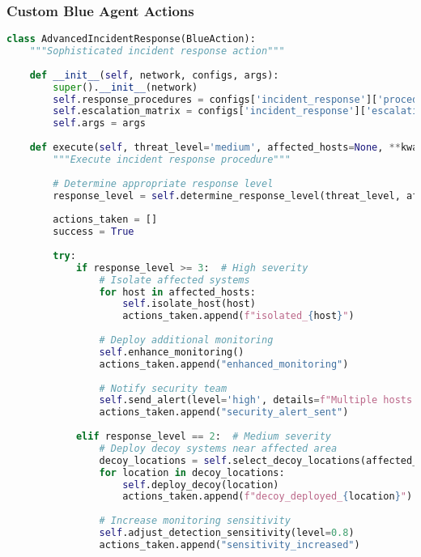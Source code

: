 \documentclass[12pt,a4paper]{article}
\begin{document}
\subsubsection{Custom Blue Agent Actions}
\begin{lstlisting}[language=Python, caption=Advanced Blue Agent Actions]
class AdvancedIncidentResponse(BlueAction):
    """Sophisticated incident response action"""
    
    def __init__(self, network, configs, args):
        super().__init__(network)
        self.response_procedures = configs['incident_response']['procedures']
        self.escalation_matrix = configs['incident_response']['escalation']
        self.args = args
    
    def execute(self, threat_level='medium', affected_hosts=None, **kwargs):
        """Execute incident response procedure"""
        
        # Determine appropriate response level
        response_level = self.determine_response_level(threat_level, affected_hosts)
        
        actions_taken = []
        success = True
        
        try:
            if response_level >= 3:  # High severity
                # Isolate affected systems
                for host in affected_hosts:
                    self.isolate_host(host)
                    actions_taken.append(f"isolated_{host}")
                
                # Deploy additional monitoring
                self.enhance_monitoring()
                actions_taken.append("enhanced_monitoring")
                
                # Notify security team
                self.send_alert(level='high', details=f"Multiple hosts affected: {affected_hosts}")
                actions_taken.append("security_alert_sent")
                
            elif response_level == 2:  # Medium severity
                # Deploy decoy systems near affected area
                decoy_locations = self.select_decoy_locations(affected_hosts)
                for location in decoy_locations:
                    self.deploy_decoy(location)
                    actions_taken.append(f"decoy_deployed_{location}")
                
                # Increase monitoring sensitivity
                self.adjust_detection_sensitivity(level=0.8)
                actions_taken.append("sensitivity_increased")
                

\end{lstlisting}
\end{document}

